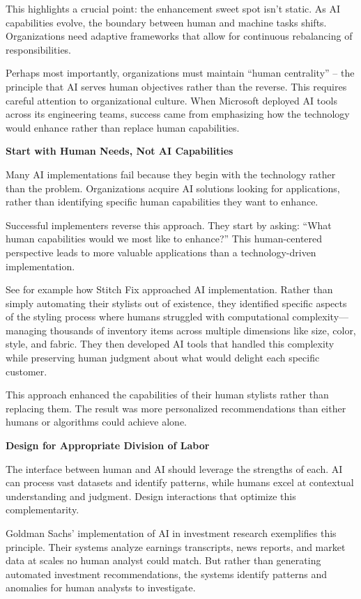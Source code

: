 \documentclass[
  Letterpaper,
]{scrbook}
\begin{document}
This highlights a crucial point: the enhancement sweet spot isn't
static. As AI capabilities evolve, the boundary between human and
machine tasks shifts. Organizations need adaptive frameworks that allow
for continuous rebalancing of responsibilities.

Perhaps most importantly, organizations must maintain ``human
centrality'' -- the
principle that AI serves human objectives rather than the reverse. This
requires careful attention to organizational
culture. When Microsoft
deployed AI tools across its engineering teams, success came from
emphasizing how the technology would enhance rather than replace human
capabilities.

\textbf{Start with Human Needs, Not AI Capabilities}

Many AI implementations fail because they begin with the technology
rather than the problem. Organizations acquire AI solutions looking for
applications, rather than identifying specific human capabilities they
want to enhance.

Successful implementers reverse this approach. They start by asking:
``What human capabilities would we most like to enhance?'' This
human-centered perspective leads to more valuable applications than a
technology-driven implementation.

See for example how Stitch Fix approached AI implementation. Rather than
simply automating their stylists out of existence, they identified
specific aspects of the styling process where humans struggled with
computational complexity---managing thousands of inventory items across
multiple dimensions like size, color, style, and fabric. They then
developed AI tools that handled this complexity while preserving human
judgment about what would delight each specific customer.

This approach enhanced the capabilities of their human stylists rather
than replacing them. The result was more personalized recommendations
than either humans or algorithms could achieve alone.

\textbf{Design for Appropriate Division of Labor}

The interface between human and AI should leverage the strengths of
each. AI can process vast datasets and identify patterns, while humans
excel at contextual understanding and judgment. Design interactions that
optimize this complementarity.

Goldman Sachs' implementation of AI in
investment research exemplifies this principle. Their systems analyze
earnings transcripts, news reports, and market data at scales no human
analyst could match. But rather than generating automated investment
recommendations, the systems identify patterns and anomalies for human
analysts to investigate.
\end{document}
